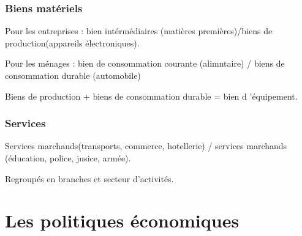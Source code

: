 	\subsection{Biens matériels}
	Pour les entreprises : bien intérmédiaires (matières premières)/biens de production(appareils électroniques).

	Pour les ménages : bien de consommation courante (alimntaire) / biens de consommation durable (automobile)

	Biens de production + biens de consommation durable = bien d 'équipement.

	\subsection{Services}
	Services marchands(transports, commerce, hotellerie) / services marchands (éducation, police, jusice, armée).

	Regroupés en branches et secteur d'activités.

	\chapter{Les politiques économiques}

